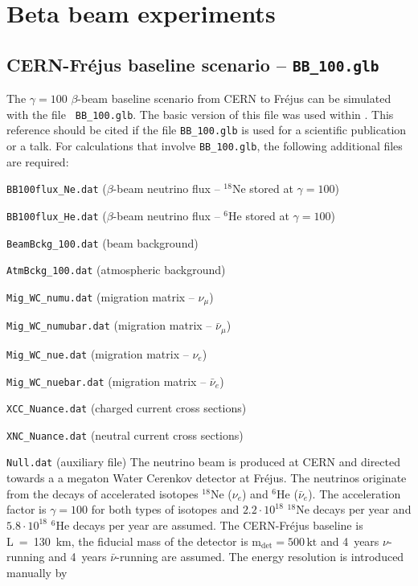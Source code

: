 \section{Beta beam experiments}
\subsection*{CERN-Fr\'{e}jus baseline scenario -- {\tt BB\_100.glb}}

The $\gamma=100$ $\beta$-beam baseline scenario from CERN to Fr\'{e}jus can be simulated with the file {\tt
BB\_100.glb}. The basic version of this file was used within \cite{Campagne:2006yx}. This reference
should be cited if the file {\tt BB\_100.glb} is used for a scientific publication or a talk. For calculations that
involve {\tt BB\_100.glb}, the following additional files are required: 
\bi
\item {\tt BB100flux\_Ne.dat} ($\beta$-beam neutrino flux -- $^{18}$Ne stored at $\gamma=100$)
\item {\tt BB100flux\_He.dat} ($\beta$-beam neutrino flux -- $^{6}$He stored at $\gamma=100$)
\item {\tt BeamBckg\_100.dat} (beam background)
\item {\tt AtmBckg\_100.dat} (atmospheric background)
\item {\tt Mig\_WC\_numu.dat} (migration matrix -- $\nu_\mu$)
\item {\tt Mig\_WC\_numubar.dat} (migration matrix -- $\bar{\nu}_\mu$)
\item {\tt Mig\_WC\_nue.dat} (migration matrix -- $\nu_e$)
\item {\tt Mig\_WC\_nuebar.dat} (migration matrix -- $\bar{\nu}_e$)
\item {\tt XCC\_Nuance.dat} (charged current cross sections)
\item {\tt XNC\_Nuance.dat} (neutral current cross sections)
\item {\tt Null.dat} (auxiliary file)
\ei
The neutrino beam is produced at CERN and directed towards a a megaton Water Cerenkov detector at Fr\'{e}jus. 
The neutrinos originate from the decays of accelerated isotopes $^{18}$Ne ($\nu_e$) and $^6$He ($\bar{\nu}_e$).
The acceleration factor is $\gamma=100$ for both types of isotopes and $2.2\cdot10^{18}$ $^{18}$Ne decays per
year and $5.8\cdot10^{18}$ $^{6}$He decays per year are assumed. The CERN-Fr\'{e}jus baseline is L~=~130~km, the
fiducial mass of the detector is $\mathrm{m_{det} = 500 \,kt}$ and 4~years $\nu$-running and 4~years
$\bar{\nu}$-running are assumed. The energy resolution is introduced manually by
